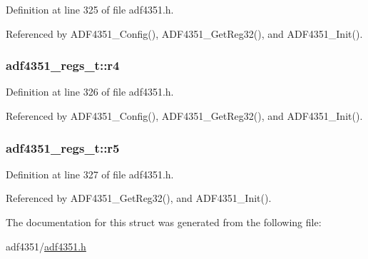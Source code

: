 Definition at line 325 of file adf4351.\+h.



Referenced by A\+D\+F4351\+\_\+\+Config(), A\+D\+F4351\+\_\+\+Get\+Reg32(), and A\+D\+F4351\+\_\+\+Init().

\subsubsection[{\texorpdfstring{r4}{r4}}]{ adf4351\+\_\+regs\+\_\+t\+::r4}\hypertarget{structadf4351__regs__t_a343af9ab05747dd9b977603d02ebb4df}{}\label{structadf4351__regs__t_a343af9ab05747dd9b977603d02ebb4df}


Definition at line 326 of file adf4351.\+h.



Referenced by A\+D\+F4351\+\_\+\+Config(), A\+D\+F4351\+\_\+\+Get\+Reg32(), and A\+D\+F4351\+\_\+\+Init().

\subsubsection[{\texorpdfstring{r5}{r5}}]{ adf4351\+\_\+regs\+\_\+t\+::r5}\hypertarget{structadf4351__regs__t_ab0bd52a2f47aa3f45d0aa97136ec6e8c}{}\label{structadf4351__regs__t_ab0bd52a2f47aa3f45d0aa97136ec6e8c}


Definition at line 327 of file adf4351.\+h.



Referenced by A\+D\+F4351\+\_\+\+Get\+Reg32(), and A\+D\+F4351\+\_\+\+Init().



The documentation for this struct was generated from the following file\+:\begin{DoxyCompactItemize}
\item 
adf4351/\hyperlink{adf4351_8h}{adf4351.\+h}\end{DoxyCompactItemize}
